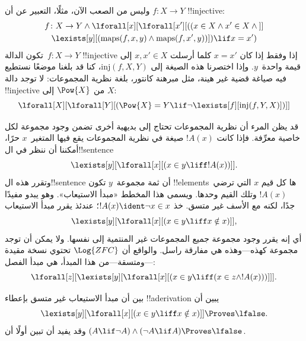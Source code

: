 \documentclass[../../../include/open-logic-section]{subfiles}
\begin{document}
وليس من الصعب الآن، مثلًا، التعبير عن أن $f\colon X \to Y$
!!{injective}:
\begin{multline*}
 f \colon X \to Y \land \lforall[x][\lforall[x'][((x \in X \land x' \in
     X \land {}]] \\
 \lexists[y][(\mathrm{maps}(f, x, y) \land \mathrm{maps}(f,
        x', y))]) \lif x = x')
\end{multline*}
تكون الدالة~$f\colon X \to Y$ !!{injective} إذا وفقط إذا كان
$x = x'$ كلما أرسلت $x, x' \in X$ إلى قيمة واحدة~$y$. وإذا اختصرنا
هذه الصيغة إلى $\mathrm{inj}(f, X, Y)$، كنا قد بلغنا موضعًا نستطيع فيه
صياغة قضية غير هينة، مثل مبرهنة كانتور، بلغة نظرية المجموعات: لا توجد
دالة !!{injective} من $\Pow{X}$ إلى $X$:
\[
\lforall[X][\lforall[Y][(\Pow{X} = Y \lif
    \lnot\lexists[f][\mathrm{inj}(f, Y, X)])]]
\]

قد يظن المرء أن نظرية المجموعات تحتاج إلى بديهية أخرى تضمن وجود
مجموعة لكل خاصية معرِّفة. فإذا كانت $!A(x)$ صيغة في نظرية المجموعات
يقع فيها المتغير~$x$ حرًا، أمكننا أن ننظر في ال!!{sentence}
\[
\lexists[y][\lforall[x][(x \in y \liff !A(x))]].
\]
وتقرر هذه ال!!{sentence} أن ثمة مجموعة~$y$ تكون !!{element}sها كل
قيم $x$ التي ترضي~$!A(x)$ وتلك القيم وحدها. ويسمى هذا المخطط «مبدأ
الاستيعاب». وهو يبدو مفيدًا جدًا، لكنه مع الأسف غير متسق. خذ
$!A(x) \ident \lnot x \in x$؛ عندئذ يقرر مبدأ الاستيعاب
\[
\lexists[y][\lforall[x][(x \in y \liff x \notin x)]],
\]
أي إنه يقرر وجود مجموعة جميع المجموعات غير المنتمية إلى نفسها. ولا
يمكن أن توجد مجموعة كهذه---وهذه هي مفارقة راسل. والواقع أن
$\Log{ZFC}$ تحتوي نسخة مقيدة---ومتسقة---من هذا المبدأ، هي مبدأ الفصل:
\[
\lforall[z][\lexists[y][\lforall[x][(x \in y \liff (x \in z \land
      !A(x)))]]].
\]

\begin{prob}
بين أن مبدأ الاستيعاب غير متسق بإعطاء !!a{derivation} يبين أن
\[
\lexists[y][\lforall[x][(x \in y \liff x \notin x)]] \Proves \lfalse.
\]
وقد يفيد أن تبين أولًا أن $(A \lif \lnot A) \land (\lnot A \lif A)
\Proves \lfalse$.
\end{prob}
\end{document}
